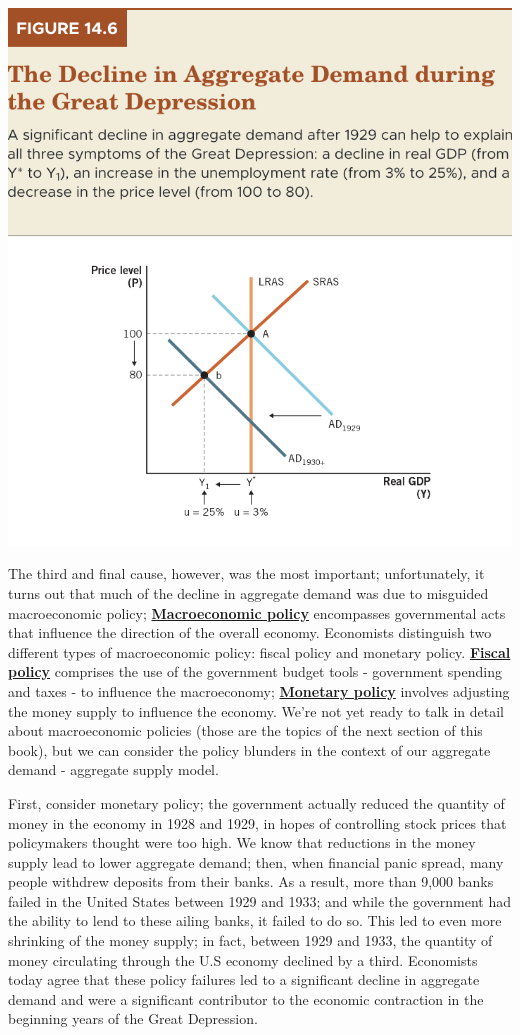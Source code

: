 \documentclass[11pt]{article} %
\begin{document}
\begin{center}
\includegraphics[scale=0.5]{images/Figure 14.6.png} 
\end{center}
The third and final cause, however, was the most important; unfortunately, it turns out that much of the decline in aggregate demand was due to misguided macroeconomic policy; \textbf{\underline{Macroeconomic policy}} encompasses governmental acts that influence the direction of the overall economy. Economists distinguish two different types of macroeconomic policy: fiscal policy and monetary policy. \textbf{\underline{Fiscal policy}} comprises the use of the government budget tools - government spending and taxes - to influence the macroeconomy; \textbf{\underline{Monetary policy}} involves adjusting the money supply to influence the economy. We're not yet ready to talk in detail about macroeconomic policies (those are the topics of the next section of this book), but we can consider the policy blunders in the context of our aggregate demand - aggregate supply model.

First, consider monetary policy; the government actually reduced the quantity of money in the economy in 1928 and 1929, in hopes of controlling stock prices that policymakers thought were too high. We know that reductions in the money supply lead to lower aggregate demand; then, when financial panic spread, many people withdrew deposits from their banks. As a result, more than 9,000 banks failed in the United States between 1929 and 1933; and while the government had the ability to lend to these ailing banks, it failed to do so. This led to even more shrinking of the money supply; in fact, between 1929 and 1933, the quantity of money circulating through the U.S economy declined by a third. Economists today agree that these policy failures led to a significant decline in aggregate demand and were a significant contributor to the economic contraction in the beginning years of the Great Depression.
\end{document}
